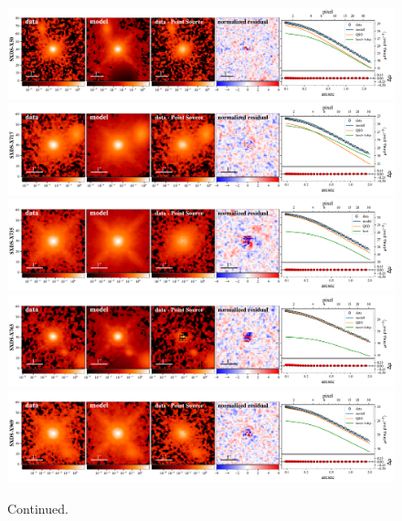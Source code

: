 \documentclass[apj]{emulateapj}
\begin{document}
\begin{figure}
\centering
{
\includegraphics[height=0.25\textwidth]{fig/best_fit_SXDS-X50_SB_profile.pdf}
\includegraphics[height=0.25\textwidth]{fig/best_fit_SXDS-X717_SB_profile.pdf}
\includegraphics[height=0.25\textwidth]{fig/best_fit_SXDS-X735_SB_profile.pdf}
\includegraphics[height=0.25\textwidth]{fig/best_fit_SXDS-X763_SB_profile.pdf}
\includegraphics[height=0.25\textwidth]{fig/best_fit_SXDS-X969_SB_profile.pdf}
}
\caption{\label{fig:ML} Continued.}
\end{figure} 
\end{document}
